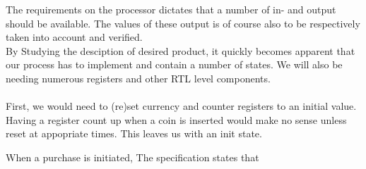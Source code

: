 The requirements on the processor dictates that a number of in- and output should be available. The values of these output is of course also to be respectively taken into account and verified.\\
By Studying the desciption of desired product, it quickly becomes apparent that our process has to implement and contain a number of states. We will also be needing numerous registers and other RTL level components.\\\\
First, we would need to (re)set currency and counter registers to an initial value. Having a register count up when a coin is inserted would make no sense unless reset at appopriate times. This leaves us with an init state.





When a purchase is initiated, The specification states that 
